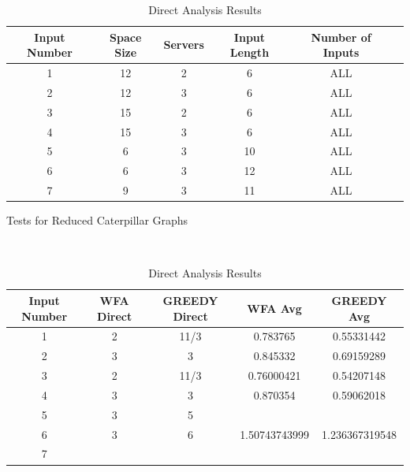 \begin{table}[!htb]
    \begin{minipage}{.5\linewidth}
      \centering
      \begin{tabular}{|c|c|c|c|c|c|}
        \hline
        Input Number & Space Size & Servers & Input Length & Number of Inputs\\
        \hline
        1 & 12 & 2 & 6 & ALL \\
        \hline
        2 & 12 & 3 & 6 & ALL \\
        \hline
        3 & 15 & 2 & 6 & ALL \\
        \hline
        4 & 15 & 3 & 6 & ALL \\
        \hline
        5 & 6 & 3 & 10 & ALL\\
        \hline
        6 & 6 & 3 & 12 & ALL\\
        \hline
        7 & 9 & 3 & 11 & ALL\\
        \hline
    \end{tabular}
        \caption{Tests for Reduced Caterpillar Graphs}
        \label{tab:tests1}
    \end{minipage}%
    \\
    \begin{minipage}{.5\linewidth}
        \centering
        \begin{tabular}{|c|c|c|c|c|}
          \hline
          Input Number & WFA Direct & GREEDY Direct & WFA Avg & GREEDY Avg\\
          \hline
          1 & 2 & 11/3 & 0.783765 & 0.55331442\\
          \hline
          2 & 3 & 3 & 0.845332 & 0.69159289\\
          \hline
          3 & 2 & 11/3 & 0.76000421 & 0.54207148\\
          \hline
          4 & 3 & 3 & 0.870354 & 0.59062018 \\
          \hline
          5 & 3 & 5 &  &  \\
          \hline
          6 & 3 & 6 & 1.50743743999 & 1.236367319548 \\
          \hline
          7 &  &  &  & \\
          \hline

      \end{tabular}
          \caption{Direct Analysis Results}
          \label{tab:results1}
    \end{minipage} 
\end{table}